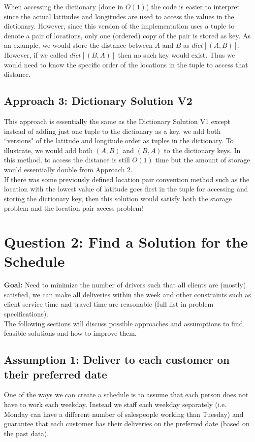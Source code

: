 \documentclass{article}
\begin{document}
When accessing the dictionary (done in $O(1)$) the code is easier to interpret since the actual latitudes and longitudes are used to access the values in the dictionary.  However, since this version of the implementation uses a tuple to denote a pair of locations, only one (ordered) copy of the pair is stored as key.  As an example, we would store the distance between $A$ and $B$ as $dict[(A,B)]$.  However, if we called $dict[(B,A)]$ then no such key would exist.  Thus we would need to know the specific order of the locations in the tuple to access that distance. 

\subsection{Approach 3: Dictionary Solution V2}
This approach is essentially the same as the Dictionary Solution V1 except instead of adding just one tuple to the dictionary as a key, we add both ``versions" of the latitude and longitude order as tuples in the dictionary.  To illustrate, we would add both $(A,B)$ and $(B,A)$ to the dictionary keys.  In this method, to access the distance is still $O(1)$ time but the amount of storage would essentially double from Approach 2.\\

If there was some previously defined location pair convention method such as the location with the lowest value of latitude goes first in the tuple for accessing and storing the dictionary key, then this solution would satisfy both the storage problem and the location pair access problem!

\section{Question 2: Find a Solution for the Schedule}
\textbf{Goal:} Need to minimize the number of drivers such that all clients are
(mostly) satisfied, we can make all deliveries within the week and other constraints
such as client service time and travel time are reasonable (full list in problem specifications).\\

The following sections will discuss possible approaches and assumptions to find feasible solutions and how to improve them.

\subsection{Assumption 1: Deliver to each customer on their preferred date}
One of the ways we can create a schedule is to assume that each person does not have to work each weekday.  Instead we staff each weekday separately (i.e. Monday can have a different number of salespeople working than Tuesday) and guarantee that each customer has their deliveries on the preferred date (based on the past data).\\  
\end{document}
